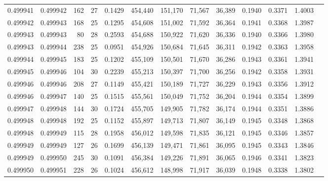 \begin{tabular}{rrrrrrrrrrrrr}
0.499941 & 0.499942 & 162 &  27 &                                     0.1429 & 454,440 & 151,170 &  71,567 &  36,389 & 0.1940 & 0.3371 & 1.4003 \\
0.499942 & 0.499943 & 168 &  25 &                                     0.1295 & 454,608 & 151,002 &  71,592 &  36,364 & 0.1941 & 0.3368 & 1.3987 \\
0.499943 & 0.499943 &  80 &  28 &                                     0.2593 & 454,688 & 150,922 &  71,620 &  36,336 & 0.1940 & 0.3366 & 1.3980 \\
0.499943 & 0.499944 & 238 &  25 &                                     0.0951 & 454,926 & 150,684 &  71,645 &  36,311 & 0.1942 & 0.3363 & 1.3958 \\
0.499944 & 0.499945 & 183 &  25 &                                     0.1202 & 455,109 & 150,501 &  71,670 &  36,286 & 0.1943 & 0.3361 & 1.3941 \\
0.499945 & 0.499946 & 104 &  30 &                                     0.2239 & 455,213 & 150,397 &  71,700 &  36,256 & 0.1942 & 0.3358 & 1.3931 \\
0.499946 & 0.499946 & 208 &  27 &                                     0.1149 & 455,421 & 150,189 &  71,727 &  36,229 & 0.1943 & 0.3356 & 1.3912 \\
0.499946 & 0.499947 & 140 &  25 &                                     0.1515 & 455,561 & 150,049 &  71,752 &  36,204 & 0.1944 & 0.3354 & 1.3899 \\
0.499947 & 0.499948 & 144 &  30 &                                     0.1724 & 455,705 & 149,905 &  71,782 &  36,174 & 0.1944 & 0.3351 & 1.3886 \\
0.499948 & 0.499948 & 192 &  25 &                                     0.1152 & 455,897 & 149,713 &  71,807 &  36,149 & 0.1945 & 0.3348 & 1.3868 \\
0.499948 & 0.499949 & 115 &  28 &                                     0.1958 & 456,012 & 149,598 &  71,835 &  36,121 & 0.1945 & 0.3346 & 1.3857 \\
0.499949 & 0.499949 & 127 &  26 &                                     0.1699 & 456,139 & 149,471 &  71,861 &  36,095 & 0.1945 & 0.3343 & 1.3846 \\
0.499949 & 0.499950 & 245 &  30 &                                     0.1091 & 456,384 & 149,226 &  71,891 &  36,065 & 0.1946 & 0.3341 & 1.3823 \\
0.499950 & 0.499951 & 228 &  26 &                                     0.1024 & 456,612 & 148,998 &  71,917 &  36,039 & 0.1948 & 0.3338 & 1.3802 \\

\end{tabular}
